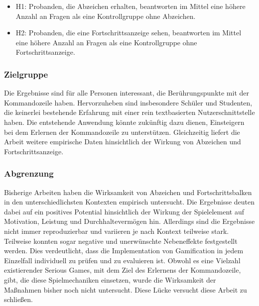 \begin{itemize}
\item H1: Probanden, die Abzeichen erhalten, beantworten im Mittel eine höhere Anzahl an Fragen als eine Kontrollgruppe ohne Abzeichen.
\item H2: Probanden, die eine Fortschrittsanzeige sehen, beantworten im Mittel eine höhere Anzahl an Fragen als eine Kontrollgruppe ohne Fortschrittsanzeige.
\end{itemize}

\subsubsection{Zielgruppe}
Die Ergebnisse sind für alle Personen interessant, die Berührungspunkte mit der Kommandozeile haben.
Hervorzuheben sind insbesondere Schüler und Studenten, die keinerlei bestehende Erfahrung mit einer rein textbasierten Nutzerschnittstelle haben.
Die entstehende Anwendung könnte zukünftig dazu dienen, Einsteigern bei dem Erlernen der Kommandozeile zu unterstützen.
Gleichzeitig liefert die Arbeit weitere empirische Daten hinsichtlich der Wirkung von Abzeichen und Fortschrittsanzeige.

\subsubsection{Abgrenzung}
Bisherige Arbeiten haben die Wirksamkeit von Abzeichen und Fortschrittsbalken in den unterschiedlichsten Kontexten empirisch untersucht.
Die Ergebnisse deuten dabei auf ein positives Potential hinsichtlich der Wirkung der Spielelement auf Motivation, Leistung und Durchhaltevermögen hin. Allerdings sind die Ergebnisse nicht immer reproduzierbar und variieren je nach Kontext teilweise stark. Teilweise konnten sogar negative und unerwünschte Nebeneffekte festgestellt werden. Dies verdeutlicht, dass die Implementation von Gamification in jedem Einzelfall individuell zu prüfen und zu evaluieren ist.
Obwohl es eine Vielzahl existierender Serious Games, mit dem Ziel des Erlernens der Kommandozeile, gibt, die diese Spielmechaniken einsetzen, wurde die Wirksamkeit der Maßnahmen bisher noch nicht untersucht. Diese Lücke versucht diese Arbeit zu schließen.